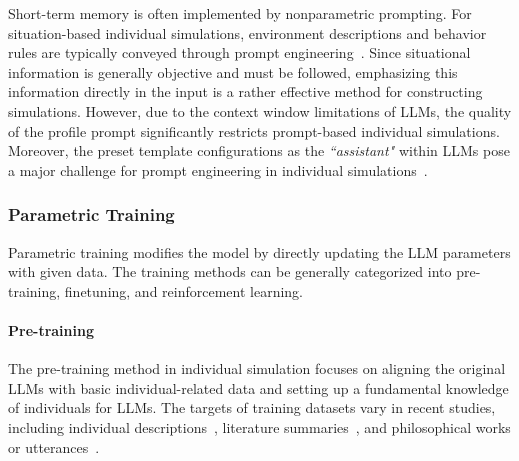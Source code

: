 Short-term memory is often implemented by nonparametric prompting. For situation-based individual simulations, environment descriptions and behavior rules are typically conveyed through prompt engineering~\cite{chalamalasetti2023clembenchusinggameplay}. Since situational information is generally objective and must be followed, emphasizing this information directly in the input is a rather effective method for constructing simulations. However, due to the context window limitations of LLMs, the quality of the profile prompt significantly restricts prompt-based individual simulations. 
Moreover, the preset template configurations as the \textit{``assistant"} within 
LLMs pose a major challenge for prompt engineering in individual simulations~\cite{tu2023characterchatlearningconversationalai}.

\subsubsection{Parametric Training}
Parametric training modifies the model by directly updating the LLM parameters with given data. The training methods can be generally categorized into pre-training, finetuning, and reinforcement learning.

\paragraph{Pre-training} The pre-training method in individual simulation focuses on aligning the original LLMs with basic individual-related data and setting up a fundamental knowledge of individuals for LLMs. The targets of training datasets vary in recent studies, including individual descriptions~\cite{salemi2024lamplargelanguagemodels}, literature summaries~\cite{brahman2021letcharacterstellstory}, and philosophical works or utterances~\cite{schwitzgebel2023creatinglargelanguagemodel}.

